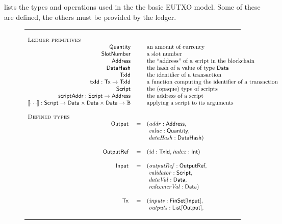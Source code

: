 \documentclass[a4paper]{article}
\newcommand{\s}{\textsf}  %
\newcommand{\msf}[1]{\ensuremath{\mathsf{#1}}}
\newcommand{\mi}[1]{\ensuremath{\mathit{#1}}}
\newcommand\rfskip{7pt}
\newenvironment{ruledfigure}[1]{\begin{figure}[#1]\hrule\vspace{\rfskip}}{\vspace{\rfskip}\hrule\end{figure}}
\newcommand{\List}[1]{\ensuremath{\s{List}[#1]}}
\newcommand{\FinSet}[1]{\ensuremath{\s{FinSet}[#1]}}
\newcommand{\script}{\ensuremath{\s{Script}}}
\newcommand{\scriptAddr}{\msf{scriptAddr}}
\newcommand{\TxId}{\ensuremath{\s{TxId}}}
\newcommand{\txId}{\msf{txId}}
\newcommand{\txrefid}{\mi{id}}
\newcommand{\Address}{\ensuremath{\s{Address}}}
\newcommand{\DataHash}{\ensuremath{\s{DataHash}}}
\newcommand{\idx}{\mi{index}}
\newcommand{\inputs}{\mi{inputs}}
\newcommand{\outputs}{\mi{outputs}}
\newcommand{\addr}{\mi{addr}}
\newcommand{\val}{\mi{value}}  %
\newcommand{\validator}{\mi{validator}}
\newcommand{\redeemerVal}{\mi{redeemerVal}}
\newcommand{\dataVal}{\mi{dataVal}}
\newcommand{\dataHash}{\mi{dataHash}}
\newcommand{\Data}{\ensuremath{\s{Data}}}
\newcommand{\outputref}{\mi{outputRef}}
\newcommand{\slotnum}{\ensuremath{\s{SlotNumber}}}
\newcommand{\eutxotx}{\msf{Tx}}
\newcommand{\qty}{\ensuremath{\s{Quantity}}}
\newcommand\B{\ensuremath{\mathbb{B}}}
\begin{document}
 lists the types and operations used in the
the basic EUTXO model. Some of these are defined, the others must be provided by
the ledger.
\begin{ruledfigure}{H}
  \begin{displaymath}
  \begin{array}{rll}
    \multicolumn{3}{l}{\textsc{Ledger primitives}}\\
    \qty{} && \mbox{an amount of currency}\\
    \slotnum && \mbox{a slot number}\\
    \Address && \mbox{the ``address'' of a script in the blockchain}\\
    \DataHash && \mbox{the hash of a value of type \Data{}}\\
    \TxId && \mbox{the identifier of a transaction}\\
    \txId : \eutxotx \rightarrow \TxId && \mbox{a function computing the identifier of a transaction}\\
    \script && \mbox{the (opaque) type of scripts}\\
    \scriptAddr : \script \rightarrow \Address && \mbox{the address of a script}\\
    \llbracket \cdots \rrbracket : \script \rightarrow \Data \times \Data \times
    \Data \rightarrow \B && \mbox{applying a script to its arguments}\\
    \\
    \multicolumn{3}{l}{\textsc{Defined types}}\\
    \s{Output } &=&(\addr: \Address,\\
                & &\ \val: \qty,\\
                & &\ \dataHash: \DataHash)\\
    \\
    \s{OutputRef } &=&(\txrefid: \TxId, \idx: \s{Int})\\
    \\
    \s{Input } &=&(\outputref: \s{OutputRef},\\
               & &\ \validator: \script,\\
               & &\ \dataVal: \Data,\\
               & &\ \redeemerVal: \Data)\\
     \\
     \eutxotx\s{ } &=&(\inputs: \FinSet{\s{Input}},\\
                   & &\ \outputs: \List{\s{Output}},\\

\end{array}
\end{displaymath}
\end{ruledfigure}
\end{document}
